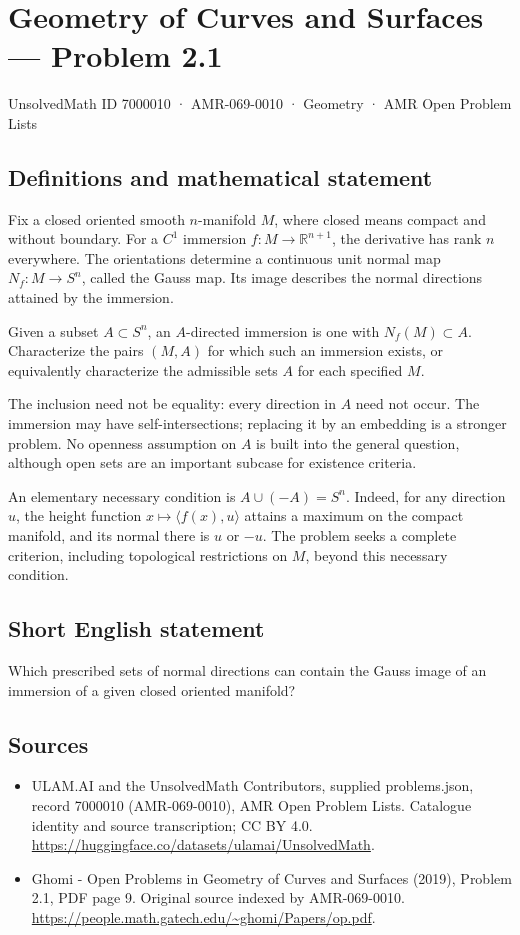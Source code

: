 \documentclass[11pt,a4paper]{article}
\begin{document}
\section*{Geometry of Curves and Surfaces — Problem 2.1}\label{7000010}
{\small UnsolvedMath ID 7000010 · AMR-069-0010 · Geometry · AMR Open Problem Lists}
\subsection{Definitions and mathematical statement}
Fix a closed oriented smooth $n$-manifold $M$, where closed means
compact and without boundary. For a $C^1$ immersion
$f:M\to\mathbb R^{n+1}$, the derivative has rank $n$ everywhere.
The orientations determine a continuous unit normal map
$N_f:M\to S^n$, called the Gauss map. Its image describes the
normal directions attained by the immersion.

Given a subset $A\subset S^n$, an $A$-directed immersion is one
with $N_f(M)\subset A$. Characterize the pairs $(M,A)$ for which
such an immersion exists, or equivalently characterize the
admissible sets $A$ for each specified $M$.

The inclusion need not be equality: every direction in $A$ need
not occur. The immersion may have self-intersections; replacing
it by an embedding is a stronger problem. No openness assumption
on $A$ is built into the general question, although open sets
are an important subcase for existence criteria.

An elementary necessary condition is $A\cup(-A)=S^n$. Indeed,
for any direction $u$, the height function
$x\mapsto\langle f(x),u\rangle$ attains a maximum on the compact
manifold, and its normal there is $u$ or $-u$. The problem seeks
a complete criterion, including topological restrictions on $M$,
beyond this necessary condition.
\subsection{Short English statement}
Which prescribed sets of normal directions can contain the Gauss
image of an immersion of a given closed oriented manifold?
\subsection{Sources}
\begin{itemize}
\item[S1] ULAM.AI and the UnsolvedMath Contributors, supplied problems.json, record 7000010 (AMR-069-0010), AMR Open Problem Lists. Catalogue identity and source transcription; CC BY 4.0.
\url{https://huggingface.co/datasets/ulamai/UnsolvedMath}.
\item[S2] Ghomi - Open Problems in Geometry of Curves and Surfaces (2019), Problem 2.1, PDF page 9. Original source indexed by AMR-069-0010.
\url{https://people.math.gatech.edu/~ghomi/Papers/op.pdf}.
\end{itemize}
\end{document}
